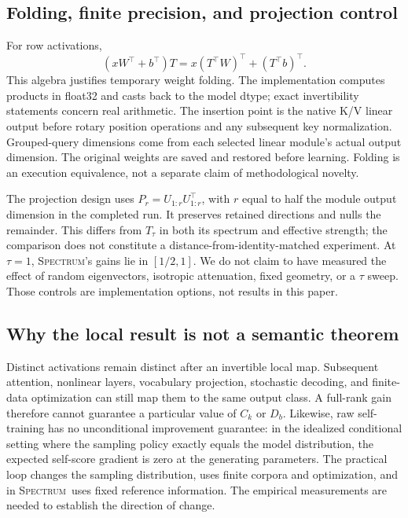 \documentclass{article}
\newcommand{\method}{\textsc{Spectrum}}
\begin{document}
\subsection{Folding, finite precision, and projection control}
For row activations,
\begin{equation}
(xW^\top+b^\top)T=x(T^\top W)^\top+(T^\top b)^\top.
\end{equation}
This algebra justifies temporary weight folding. The implementation computes products in float32 and casts back to the model dtype; exact invertibility statements concern real arithmetic. The insertion point is the native K/V linear output before rotary position operations and any subsequent key normalization. Grouped-query dimensions come from each selected linear module's actual output dimension. The original weights are saved and restored before learning. Folding is an execution equivalence, not a separate claim of methodological novelty.

The projection design uses $P_r=U_{1:r}U_{1:r}^\top$, with $r$ equal to half the module output dimension in the completed run. It preserves retained directions and nulls the remainder. This differs from $T_\tau$ in both its spectrum and effective strength; the comparison does not constitute a distance-from-identity-matched experiment. At $\tau=1$, \method's gains lie in $[1/2,1]$. We do not claim to have measured the effect of random eigenvectors, isotropic attenuation, fixed geometry, or a $\tau$ sweep. Those controls are implementation options, not results in this paper.

\subsection{Why the local result is not a semantic theorem}
Distinct activations remain distinct after an invertible local map. Subsequent attention, nonlinear layers, vocabulary projection, stochastic decoding, and finite-data optimization can still map them to the same output class. A full-rank gain therefore cannot guarantee a particular value of $C_k$ or $D_b$. Likewise, raw self-training has no unconditional improvement guarantee: in the idealized conditional setting where the sampling policy exactly equals the model distribution, the expected self-score gradient is zero at the generating parameters. The practical loop changes the sampling distribution, uses finite corpora and optimization, and in \method\ uses fixed reference information. The empirical measurements are needed to establish the direction of change.
\end{document}
